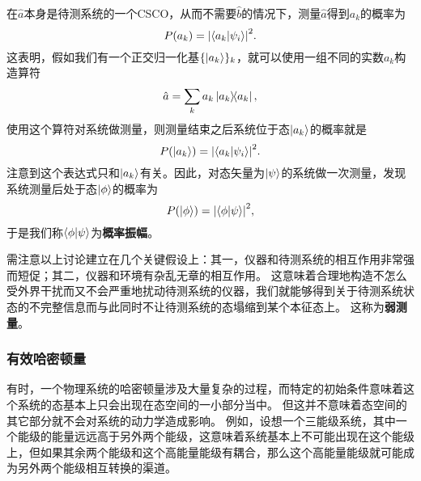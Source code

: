 \documentclass[hyperref, UTF8, a4paper]{ctexart}
\begin{document}
在$\hat{a}$本身是待测系统的一个CSCO，从而不需要$\hat{b}$的情况下，测量$\hat{a}$得到$a_k$的概率为
\begin{equation}
    P(a_k) = \abs{\braket{a_k}{\psi_i}}^2.
\end{equation}
这表明，假如我们有一个正交归一化基$\{\ket{a_k}\}_k$，就可以使用一组不同的实数$a_k$构造算符
\[
    \hat{a} = \sum_k a_k \dyad{a_k},
\]
使用这个算符对系统做测量，则测量结束之后系统位于态$\ket{a_k}$的概率就是
\begin{equation}
    P(\ket{a_k}) = \abs{\braket{a_k}{\psi_i}}^2.
\end{equation}
注意到这个表达式只和$\ket{a_k}$有关。因此，对态矢量为$\ket{\psi}$的系统做一次测量，发现系统测量后处于态$\ket{\phi}$的概率为
\begin{equation}
    P(\ket{\phi}) = \abs{\braket{\phi}{\psi}}^2,
\end{equation}
于是我们称$\braket{\phi}{\psi}$为\textbf{概率振幅}。

需注意以上讨论建立在几个关键假设上：其一，仪器和待测系统的相互作用非常强而短促；其二，仪器和环境有杂乱无章的相互作用。
这意味着合理地构造不怎么受外界干扰而又不会严重地扰动待测系统的仪器，我们就能够得到关于待测系统状态的不完整信息而与此同时不让待测系统的态塌缩到某个本征态上。
这称为\textbf{弱测量}。

\subsubsection{有效哈密顿量}

有时，一个物理系统的哈密顿量涉及大量复杂的过程，而特定的初始条件意味着这个系统的态基本上只会出现在态空间的一小部分当中。
但这并不意味着态空间的其它部分就不会对系统的动力学造成影响。
例如，设想一个三能级系统，其中一个能级的能量远远高于另外两个能级，这意味着系统基本上不可能出现在这个能级上，但如果其余两个能级和这个高能量能级有耦合，那么这个高能量能级就可能成为另外两个能级相互转换的渠道。
\end{document}
